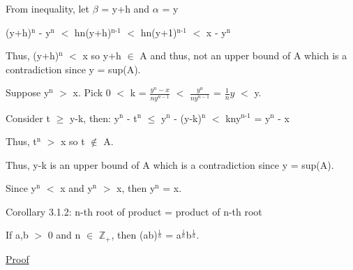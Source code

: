{\begin{minipage}{15cm}
		\hspace{1cm}
		From inequality, let $\beta$ = y+h and $\alpha$ = y

		\hspace{1cm}
		(y+h)$^\text{n}$ - y$^\text{n}$ $<$ hn(y+h)$^\text{n-1}$
		$<$ hn(y+1)$^\text{n-1}$ $<$ x - y$^\text{n}$

		\begin{adjustbox}{minipage=14.2cm, right, vspace=0.1cm 0cm}
			Thus, (y+h)$^\text{n}$ $<$ x so y+h $\in$ A and thus, not an upper bound of A
			which is a contradiction since y = sup(A).
		\end{adjustbox}

		Suppose y$^\text{n}$ $>$ x.
		Pick 0 $<$ k = $\frac{y^n - x}{ny^{n-1}}$ $<$ $\frac{y^n}{ny^{n-1}}$
		= $\frac{1}{n}y$ $<$ y.

		\hspace{1cm}
		Consider t $ \geq $  y-k, then:
		y$^\text{n}$ - t$^\text{n}$ $ \leq $  y$^\text{n}$ - (y-k)$^\text{n}$ $<$
		kny$^\text{n-1}$ = y$^\text{n}$ - x

		\hspace{1cm}
		Thus, t$^\text{n}$ $>$ x so t $\not \in$ A.

		\hspace{1cm}
		Thus, y-k is an upper bound of A which is a contradiction since y = sup(A).

		Since y$^\text{n}$ $<$ x and y$^\text{n}$ $>$ x, then y$^\text{n}$ = x.
	\end{minipage} } 

\newpage

{ \color{orange} Corollary 3.1.2: n-th root of product = product of n-th root} 

	\begin{adjustbox}{minipage=14cm, right, vspace=0.1cm 0cm}
		If a,b $>$ 0 and n $\in$ $\mathbb{Z}_+$, then
		(ab)$^{\frac{1}{n}}$ = a$^{\frac{1}{n}}$b$^{\frac{1}{n}}$.  
	\end{adjustbox}

{ \color{magenta} \underline{Proof} }





